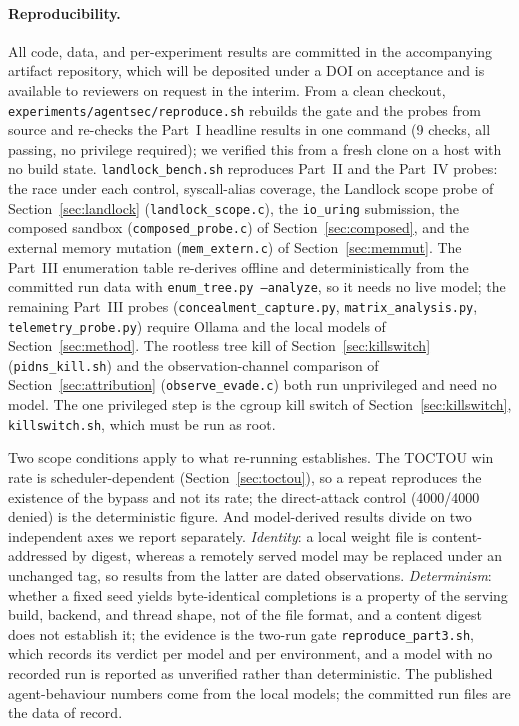 \documentclass[11pt]{article}
\newcommand{\Nrace}{4000}
\begin{document}
\paragraph{Reproducibility.} All code, data, and per-experiment results are committed in the
accompanying artifact repository, which will be deposited under a DOI on acceptance and is
available to reviewers on request in the interim. From a clean
checkout, \texttt{experiments/agentsec/reproduce.sh} rebuilds the gate and the probes from source
and re-checks the Part~I headline results in one command (9 checks, all passing, no privilege
required); we verified this from a fresh clone on a host with no build state.
\texttt{landlock\_bench.sh} reproduces Part~II and the Part~IV probes: the race under each control,
syscall-alias coverage, the Landlock scope probe of Section~\ref{sec:landlock}
(\texttt{landlock\_scope.c}), the \texttt{io\_uring} submission, the composed sandbox
(\texttt{composed\_probe.c}) of Section~\ref{sec:composed}, and the external memory mutation
(\texttt{mem\_extern.c}) of Section~\ref{sec:memmut}. The Part~III enumeration table re-derives
offline and deterministically from the committed run data with \texttt{enum\_tree.py --analyze},
so it needs no live model; the remaining Part~III probes (\texttt{concealment\_capture.py},
\texttt{matrix\_analysis.py}, \texttt{telemetry\_probe.py}) require Ollama and the local models of
Section~\ref{sec:method}. The rootless tree kill of Section~\ref{sec:killswitch}
(\texttt{pidns\_kill.sh}) and the observation-channel comparison of Section~\ref{sec:attribution}
(\texttt{observe\_evade.c}) both run unprivileged and need no model. The one privileged step is the
cgroup kill switch of Section~\ref{sec:killswitch}, \texttt{killswitch.sh}, which must be run as
root.

Two scope conditions apply to what re-running establishes. The TOCTOU win rate is
scheduler-dependent (Section~\ref{sec:toctou}), so a repeat reproduces the existence of the bypass
and not its rate; the direct-attack control (\Nrace/\Nrace{} denied) is the deterministic figure.
And model-derived results divide on two independent axes we report separately. \emph{Identity}: a
local weight file is content-addressed by digest, whereas a remotely served model may be replaced
under an unchanged tag, so results from the latter are dated observations. \emph{Determinism}:
whether a fixed seed yields byte-identical completions is a property of the serving build, backend,
and thread shape, not of the file format, and a content digest does not establish it; the evidence
is the two-run gate \texttt{reproduce\_part3.sh}, which records its verdict per model and per
environment, and a model with no recorded run is reported as unverified rather than deterministic.
The published
agent-behaviour numbers come from the local models; the committed run files are the data of record.
\end{document}
